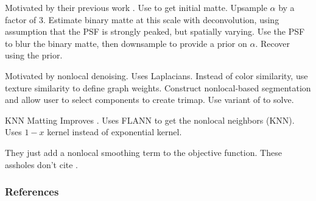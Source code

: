 \documentclass{beamer}
\begin{document}
\begin{frame}[allowframebreaks]{\cite{rhemann2010spatially}}
 Motivated by their previous work \cite{rhemann2008high}.
 Use \cite{rhemann2008high} to get initial matte.
 Upsample $\alpha$ by a factor of 3.
 Estimate binary matte at this scale with deconvolution, using assumption that
 the PSF is strongly peaked, but spatially varying.
 Use the PSF to blur the binary matte, then downsample to provide a prior on $\alpha$.
 Recover using the prior.
\end{frame}

\begin{frame}[allowframebreaks]{\cite{lee2011nonlocal}}
 Motivated by nonlocal denoising.
 Uses Laplacians.
 Instead of color similarity, use texture similarity to define graph weights.
 Construct nonlocal-based segmentation and allow user to select components
 to create trimap.
 Use variant of \cite{levin2008closed} to solve.
\end{frame}

\begin{frame}[allowframebreaks]{KNN Matting \cite{chen2012knn}}
 Improves \cite{lee2011nonlocal}.
 Uses FLANN to get the nonlocal neighbors (KNN).
 Uses $1-x$ kernel instead of exponential kernel.
\end{frame}

\begin{frame}[allowframebreaks]{\cite{chen2013image}}
 They just add a nonlocal smoothing term to the objective function.
 These assholes don't cite \cite{lee2011nonlocal}.
\end{frame}

\begin{frame}[allowframebreaks]{}
 
\end{frame}

\begin{frame}[allowframebreaks]
 \frametitle{References}
 
 
\end{frame}
\end{document}
